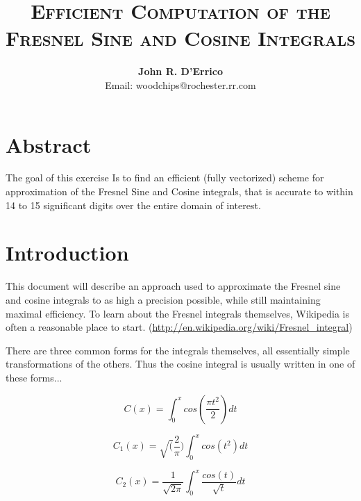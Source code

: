 \documentclass[a4paper,11pt]{article}
\begin{document}

\title{\textsc{Efficient Computation of the Fresnel Sine and Cosine Integrals}}

\author{\textbf{John R. D'Errico}\\
Email: woodchips@rochester.rr.com}

\maketitle

\section{Abstract}
The goal of this exercise Is to find an efficient (fully vectorized) scheme for approximation of the Fresnel Sine and Cosine integrals, that is accurate to within 14 to 15 significant digits over the entire domain of interest.

\section{Introduction}

This document will describe an approach used to approximate the Fresnel sine and cosine integrals to as high a precision possible, while still maintaining maximal efficiency. To learn about the Fresnel integrals themselves, Wikipedia is often a reasonable place to start. (\url{http://en.wikipedia.org/wiki/Fresnel_integral})

There are three common forms for the integrals themselves, all essentially simple transformations of the others. Thus the cosine integral is usually written in one of these forms...

\begin{equation}
    C(x) = \int_0^x cos(\frac{\pi t^2}{2}) dt
\end{equation}

\begin{equation}
    C_1(x) = \sqrt(\frac{2}{\pi}) \int_0^x cos(t^2) dt
\end{equation}

\begin{equation}
    C_2(x) = \frac{1}{\sqrt{2 \pi}} \int_0^x \frac{cos(t)} {\sqrt{t}} dt
\end{equation}
\end{document}

